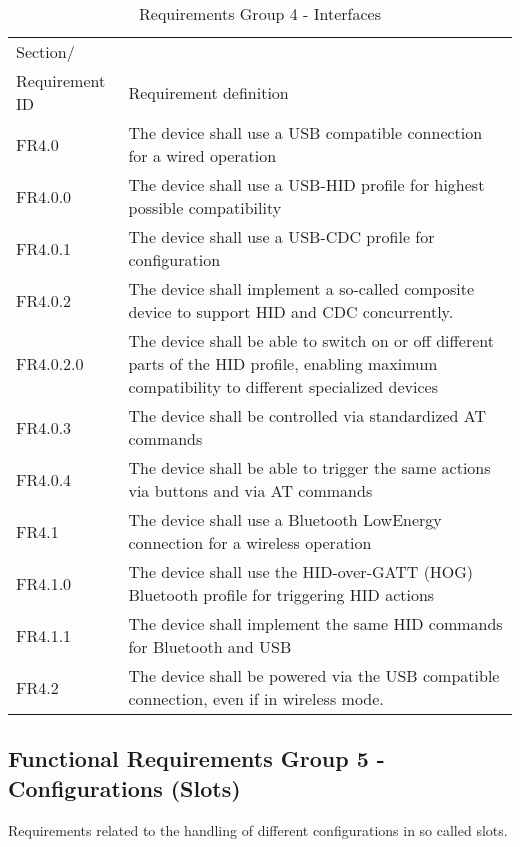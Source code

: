 \documentclass[]{scrreprt}%
\begin{document}
\begin{table}[htb!]
 \centering
 \caption{Requirements Group 4 - Interfaces}
\label{req_group4}
 \begin{tabularx}{\textwidth}{|l|X|} \hline
 Section/\\ Requirement ID & Requirement definition\\ \hline  \hline
 FR4.0 & The device shall use a USB compatible connection for a wired operation\\ \hline
 FR4.0.0 & The device shall use a USB-HID profile for highest possible compatibility\\ \hline
 FR4.0.1 & The device shall use a USB-CDC profile for configuration\\ \hline
 FR4.0.2 & The device shall implement a so-called composite device to support HID and CDC concurrently.\\ \hline
 FR4.0.2.0 & The device shall be able to switch on or off different parts of the HID profile, enabling maximum compatibility 
 to different specialized devices \\ \hline
 FR4.0.3 & The device shall be controlled via standardized AT commands\\ \hline
 FR4.0.4 & The device shall be able to trigger the same actions via buttons and via AT commands\\ \hline
 FR4.1 & The device shall use a Bluetooth LowEnergy connection for a wireless operation\\ \hline
 FR4.1.0 & The device shall use the HID-over-GATT (HOG) Bluetooth profile for triggering HID actions\\ \hline
 FR4.1.1 & The device shall implement the same HID commands for Bluetooth and USB\\ \hline
 FR4.2 & The device shall be powered via the USB compatible connection, even if in wireless mode.\\ \hline
 \end{tabularx}
\end{table}

\subsection{Functional Requirements Group 5 - Configurations (Slots)}

Requirements related to the handling of different configurations in so called slots.
\end{document}
